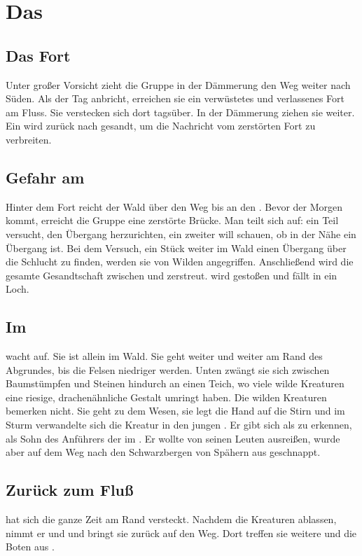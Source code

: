 \documentclass[12pt,a4paper,onecolumn,oneside,ngerman]{book}
\begin{document}
\part{Das \Grunland}
\chapter{Das Fort}
Unter großer Vorsicht zieht die Gruppe in der Dämmerung den Weg weiter nach Süden.\linebreak
Als der Tag anbricht, erreichen sie ein verwüstetes und verlassenes Fort am Fluss. Sie verstecken sich dort tagsüber. In der Dämmerung ziehen sie weiter. Ein  {\Schattenlaufer} wird zurück nach {\Planis} gesandt, um die Nachricht vom zerstörten Fort zu verbreiten.

\chapter{Gefahr am \Dreifluss}
Hinter dem Fort reicht der Wald über den Weg bis an den {\Dreifluss}. Bevor der Morgen kommt, erreicht die Gruppe eine zerstörte Brücke.\linebreak
Man teilt sich auf: ein Teil versucht, den Übergang herzurichten, ein zweiter will schauen, ob in der Nähe ein Übergang ist. Bei dem Versuch, ein Stück weiter im Wald einen Übergang über die Schlucht zu finden, werden sie von Wilden angegriffen. Anschließend wird die gesamte Gesandtschaft zwischen {\Dreifluss} und {\Riesenwald} zerstreut.  {\Sena} wird gestoßen und fällt in ein Loch.

\chapter{Im \Riesenwald}
{\Sena} wacht auf. Sie ist allein im Wald. Sie geht weiter und weiter am Rand des Abgrundes, bis die Felsen niedriger werden. Unten zwängt sie sich zwischen Baumstümpfen und Steinen hindurch an einen Teich, wo viele wilde Kreaturen eine riesige, drachenähnliche Gestalt umringt haben.\linebreak
Die wilden Kreaturen bemerken {\Sena} nicht. Sie geht zu dem Wesen, sie legt die Hand auf die Stirn und im Sturm verwandelte sich die Kreatur in den jungen {\Bangiri}. Er gibt sich als {\Papato} zu erkennen, als Sohn des Anführers der {\Bangiri} im {\Enland}. Er wollte von seinen Leuten ausreißen, wurde aber auf dem Weg nach den Schwarzbergen von Spähern aus {\Lobarn} geschnappt. 

\chapter{Zurück zum Fluß}
{\Tremor} hat sich die ganze Zeit am Rand versteckt. Nachdem die Kreaturen ablassen, nimmt er {\Sena} und \Papato  und bringt sie zurück auf den Weg. Dort treffen sie weitere {\Schattenlaufer} und die Boten aus {\Rhingell}.
\end{document}
